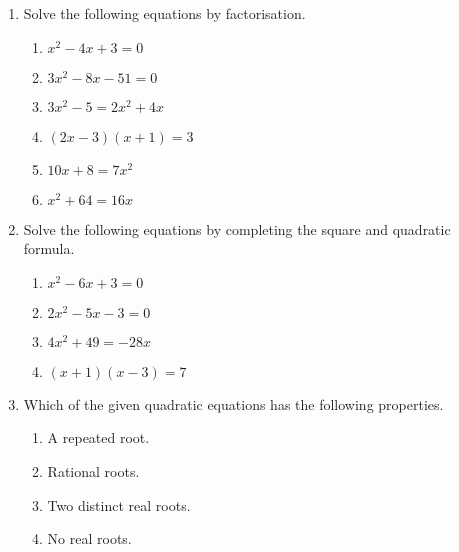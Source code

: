 \documentclass[11pt]{article}
\begin{document}
\begin{enumerate}
    \item Solve the following equations by factorisation.
    \begin{multicols}{3}
        \renewcommand{\labelenumii}{\arabic{enumii})}
        \begin{enumerate}
            \item $x^2-4x+3=0$
            \vspace{30mm}
            \item $3x^2-8x-51=0$
            \item $3x^2-5=2x^2+4x$
            \vspace{30mm}
            \item $(2x-3)(x+1)=3$
            \item $10x+8=7x^2$
            \vspace{30mm}
            \item $x^2+64=16x$
        \end{enumerate}
    \end{multicols}
    \vspace{30mm}
    \item Solve the following equations by completing the square and quadratic formula.
    \begin{multicols}{2}
        \renewcommand{\labelenumii}{\arabic{enumii})}
        \begin{enumerate}
            \item $x^2-6x+3=0$
            \vspace{50mm}
            \item $2x^2-5x-3=0$
            \item $4x^2+49=-28x$
            \vspace{50mm}
            \item $(x+1)(x-3)=7$
        \end{enumerate}
    \end{multicols}
    \newpage
    \item Which of the given quadratic equations has the following properties.
\begin{multicols}{3}
    \begin{enumerate}
    \renewcommand{\labelenumi}{\alph{enumi})}
    \item A repeated root.
    \item Rational roots.
    \item Two distinct real roots.
    \item No real roots.

\end{enumerate}
\end{multicols}
\end{enumerate}
\end{document}
